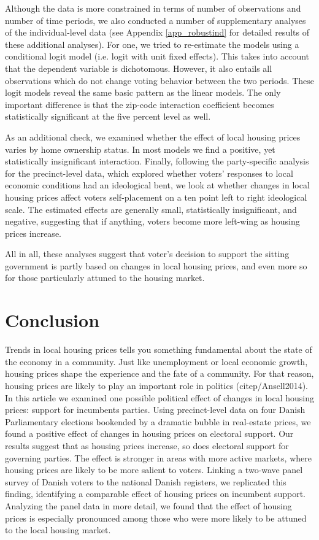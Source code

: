 \documentclass[12pt,a4paper]{article}
\begin{document}
	Although the data is more constrained in terms of number of observations and number of time periods, we also conducted a number of supplementary analyses of the individual-level data (see Appendix \ref{app_robustind} for detailed results of these additional analyses). For one, we tried to re-estimate the models using a conditional logit model (i.e. logit with unit fixed effects). This takes into account that the dependent variable is dichotomous. However, it also entails all observations which do not change voting behavior between the two periods. These logit models reveal the same basic pattern as the linear models. The only important difference is that the zip-code interaction coefficient becomes statistically significant at the five percent level as well. 
	
	As an additional check, we examined whether the effect of local housing prices varies by home ownership status. In most models we find a positive, yet statistically insignificant interaction. Finally, following the party-specific analysis for the precinct-level data, which explored whether voters’ responses to local economic conditions had an ideological bent, we look at whether changes in local housing prices affect voters self-placement on a ten point left to right ideological scale. The estimated effects are generally small, statistically insignificant, and negative, suggesting that if anything, voters become more left-wing as housing prices increase.
	
	All in all, these analyses suggest that voter’s decision to support the sitting government is partly based on changes in local housing prices, and even more so for those particularly attuned to the housing market.
	
	\section{Conclusion}
	Trends in local housing prices tells you something fundamental about the state of the economy in a community. Just like unemployment or local economic growth, housing prices shape the experience and the fate of a community. For that reason, housing prices are likely to play an important role in politics (citep/Ansell2014). In this article we examined one possible political effect of changes in local housing prices: support for incumbents parties. Using precinct-level data on four Danish Parliamentary elections bookended by a dramatic bubble in real-estate prices, we found a positive effect of changes in housing prices on electoral support. Our results suggest that as housing prices increase, so does electoral support for governing parties. The effect is stronger in areas with more active markets, where housing prices are likely to be more salient to voters. Linking a two-wave panel survey of Danish voters to the national Danish registers, we replicated this finding, identifying a comparable effect of housing prices on incumbent support. Analyzing the panel data in more detail, we found that the effect of housing prices is especially pronounced among those who were more likely to be attuned to the local housing market. 
	
\end{document}
